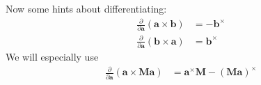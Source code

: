 Now some hints about differentiating:
\begin{align}
\frac{\partial}{\partial \mathbf{a}} \left( \mathbf{a} \times \mathbf{b} \right)
& = - \mathbf{b} ^\times \\
\frac{\partial}{\partial \mathbf{a}} \left( \mathbf{b} \times \mathbf{a} \right)
& = \mathbf{b} ^\times
\end{align}
We will especially use
\begin{align}
\frac{\partial}{\partial \mathbf{a}} \left( \mathbf{a} \times \textbf{M} \mathbf{a} \right)
& = \mathbf{a}^\times \mathbf{M} - (\mathbf{M} \mathbf{a})^\times
\end{align}
